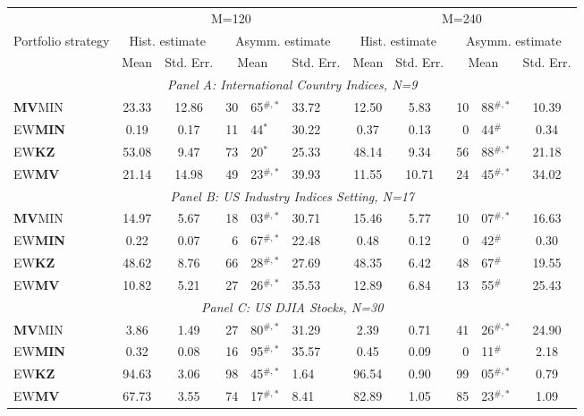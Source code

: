 \begin{tabularx}{1\textwidth}{@{}Xccr@{.}llccr@{.}lc}
\toprule
 & \multicolumn{5}{c}{M=120} & \multicolumn{5}{c}{M=240}  \\
    \cmidrule(l{0.25em}){2-6}  \cmidrule(l{0.25em}){7-11}
\multirow{2}{*}{Portfolio strategy} & \multicolumn{2}{c}{Hist. estimate} & \multicolumn{3}{c}{Asymm. estimate} & \multicolumn{2}{c}{Hist. estimate} & \multicolumn{3}{c}{Asymm. estimate}  \\
 \cmidrule(l{0.25em}){2-3} \cmidrule(l{0.25em}){4-6}  \cmidrule(l{0.25em}){7-9} \cmidrule(l{0.25em}){10-11}
 & Mean & Std. Err. & \multicolumn{2}{c}{Mean} & Std. Err. & Mean & Std. Err. & \multicolumn{2}{c}{Mean} & Std. Err. \\
\midrule  %
\multicolumn{11}{c}{\emph{Panel A: International Country Indices, N=9}} \\
\addlinespace
\textbf{MV}MIN & 23.33 & 12.86 & 30&65$^{\#,*}$ & 33.72 & 12.50 &  5.83     & 10&88$^{\#,*}$ & 10.39 \\
EW\textbf{MIN} &  0.19 & 0.17  & 11&44$^{*}$ & 30.22 &  0.37 &  0.13     &  0&44$^{\#}$   &  0.34 \\
EW\textbf{KZ}  & 53.08 & 9.47  & 73&20$^{*}$   & 25.33 & 48.14 &  9.34     & 56&88$^{\#,*}$ & 21.18 \\
EW\textbf{MV}  & 21.14 & 14.98 & 49&23$^{\#,*}$ & 39.93 & 11.55 & 10.71     & 24&45$^{\#,*}$ & 34.02 \\
\midrule
\multicolumn{11}{c}{\emph{Panel B: US Industry Indices Setting, N=17}} \\
\addlinespace
\textbf{MV}MIN & 14.97 & 5.67 & 18&03$^{\#,*}$ & 30.71 & 15.46 & 5.77 & 10&07$^{\#,*}$    & 16.63 \\
EW\textbf{MIN} & 0.22  & 0.07 &  6&67$^{\#,*}$   & 22.48 & 0.48  & 0.12 &  0&42$^{\#}$    & 0.30 \\
EW\textbf{KZ}  & 48.62 & 8.76 & 66&28$^{\#,*}$ & 27.69 & 48.35 & 6.42 & 48&67$^{\#}$      & 19.55 \\
EW\textbf{MV}  & 10.82 & 5.21 & 27&26$^{\#,*}$   & 35.53 & 12.89 & 6.84 & 13&55$^{\#}$      & 25.43 \\
\midrule
\multicolumn{11}{c}{\emph{Panel C: US DJIA Stocks, N=30}} \\
\addlinespace
\textbf{MV}MIN & 3.86  &  1.49 & 27&80$^{\#,*}$   & 31.29 &  2.39 & 0.71        & 41&26$^{\#,*}$ & 24.90  \\
EW\textbf{MIN} & 0.32  &  0.08 & 16&95$^{\#,*}$   & 35.57 &  0.45 & 0.09        &  0&11$^{\#}$ &  2.18  \\
EW\textbf{KZ}  & 94.63 &  3.06 & 98&45$^{\#,*}$   & 1.64  & 96.54 & 0.90        & 99&05$^{\#,*}$ &  0.79  \\
EW\textbf{MV}  & 67.73 &  3.55 & 74&17$^{\#,*}$   & 8.41  & 82.89 & 1.05        & 85&23$^{\#,*}$ &  1.09  \\
\bottomrule
\end{tabularx}
